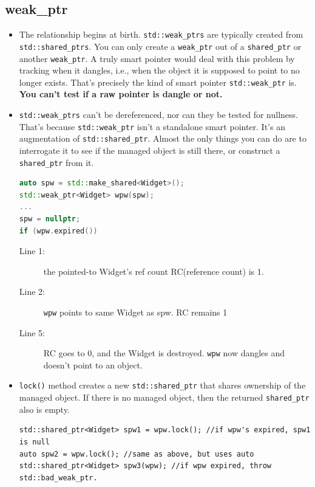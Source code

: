 \documentclass[a4paper,11pt,twoside]{book}
\begin{document}
\subsection{weak\_ptr}
\begin{itemize}

    \item The relationship begins at birth. \texttt{std::weak\_ptrs} are typically created from \texttt{std::shared\_ptrs}. You can only create a \texttt{weak\_ptr} out of a \texttt{shared\_ptr} or another \texttt{weak\_ptr}. A truly smart pointer would deal with this problem by tracking when it dangles, i.e., when the object it is supposed to point to no longer exists. That's precisely the kind of smart pointer \texttt{std::weak\_ptr} is. \textbf{You can't test if a raw pointer is dangle or not.}

    \item \texttt{std::weak\_ptrs} can't be dereferenced, nor can they be tested for nullness. That's because \texttt{std::weak\_ptr} isn't a standalone smart pointer. It's an augmentation of \texttt{std::shared\_ptr}. Almost the only things you can do are to interrogate it to see if the managed object is still there, or construct a \texttt{shared\_ptr} from it.

\begin{lstlisting}[frame=single, language=c++,mathescape=true]
auto spw = std::make_shared<Widget>();
std::weak_ptr<Widget> wpw(spw);
...
spw = nullptr;
if (wpw.expired())
\end{lstlisting}
\begin{description}
	\item[Line 1:] the pointed-to Widget's ref count RC(reference count) is 1.
	\item[Line 2:] \texttt{wpw} points to same Widget as spw. RC remains 1
	\item[Line 5:] RC goes to 0, and the Widget is destroyed. \texttt{wpw} now dangles and doesn't point to an object.
\end{description}

    \item \texttt{lock()} method creates a new \texttt{std::shared\_ptr} that shares ownership of the managed object. If there is no managed object, then the returned \texttt{shared\_ptr} also is empty.

\begin{lstlisting}
std::shared_ptr<Widget> spw1 = wpw.lock(); //if wpw's expired, spw1 is null
auto spw2 = wpw.lock(); //same as above, but uses auto
std::shared_ptr<Widget> spw3(wpw); //if wpw expired, throw std::bad_weak_ptr.
\end{lstlisting}


\end{itemize}
\end{document}
